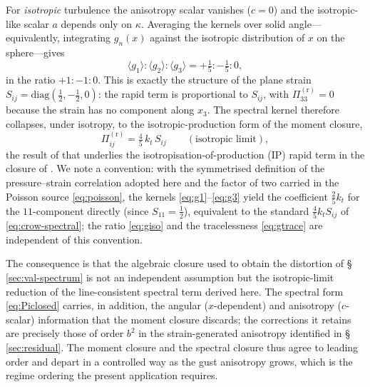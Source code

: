 \documentclass[lineno]{JFM-FLM_Au}
\newcounter{assumption}
\begin{document}
For \emph{isotropic} turbulence the anisotropy scalar vanishes ($c=0$) and the
isotropic-like scalar $a$ depends only on $\kappa$. Averaging the kernels over
solid angle---equivalently, integrating $g_n(x)$ against the isotropic
distribution of $x$ on the sphere---gives
\begin{equation}
  \langle g_1\rangle : \langle g_2\rangle : \langle g_3\rangle
  = +\tfrac15 : -\tfrac15 : 0,
  \label{eq:giso}
\end{equation}
in the ratio $+1:-1:0$. This is exactly the structure of the plane strain
$S_{ij}=\mathrm{diag}(\tfrac12,-\tfrac12,0)$: the rapid term is proportional to
$S_{ij}$, with $\Pi^{(\mathrm r)}_{33}=0$ because the strain has no component
along $x_3$. The spectral kernel therefore collapses, under isotropy, to the
isotropic-production form of the moment closure,
\begin{equation}
  \Pi^{(\mathrm r)}_{ij}
  = \tfrac{4}{5}\,k_t\,S_{ij}
  \qquad(\text{isotropic limit}),
  \label{eq:crow-spectral}
\end{equation}
the result of \citet{Crow1968} that underlies the isotropisation-of-production
(IP) rapid term in the closure of \citet{LaunderReeceRodi1975}. We note a
convention: with the symmetrised definition of the pressure--strain correlation
adopted here and the factor of two carried in the Poisson source
\eqref{eq:poisson}, the kernels \eqref{eq:g1}--\eqref{eq:g3} yield the
coefficient $\tfrac25 k_t$ for the $11$-component directly (since $S_{11}=\tfrac12$),
equivalent to the standard $\tfrac45 k_t S_{ij}$ of \eqref{eq:crow-spectral}; the ratio
\eqref{eq:giso} and the tracelessness \eqref{eq:gtrace} are independent of this
convention.

The consequence is that the algebraic closure used to obtain the distortion of
\S\,\ref{sec:val-spectrum} is not an independent assumption but the
isotropic-limit reduction of the line-consistent spectral term derived here.
The spectral form \eqref{eq:Piclosed} carries, in addition, the angular
($x$-dependent) and anisotropy ($c$-scalar) information that the moment closure
discards; the corrections it retains are precisely those of order $b^2$ in the
strain-generated anisotropy identified in \S\,\ref{sec:residual}. The moment
closure and the spectral closure thus agree to leading order and depart in a
controlled way as the gust anisotropy grows, which is the regime ordering the
present application requires.
\end{document}
